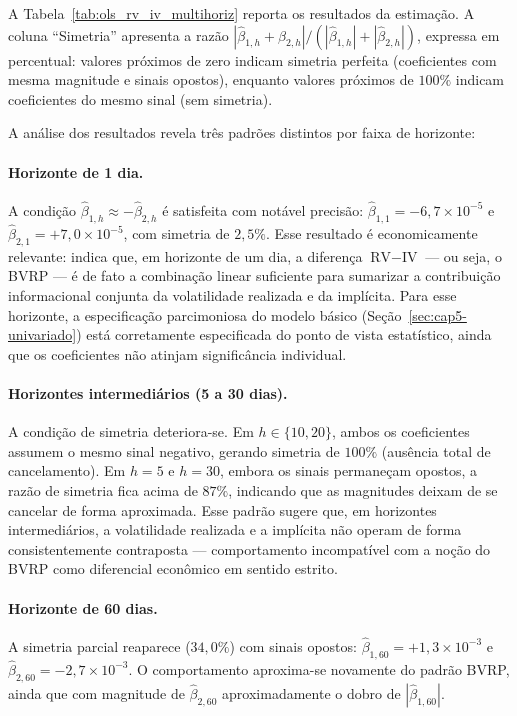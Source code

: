 A Tabela~\ref{tab:ols_rv_iv_multihoriz} reporta os resultados da estimação. A
coluna ``Simetria'' apresenta a razão
$|\hat{\beta}_{1,h} + \hat{\beta}_{2,h}| / (|\hat{\beta}_{1,h}| + |\hat{\beta}_{2,h}|)$,
expressa em percentual: valores próximos de zero indicam simetria perfeita
(coeficientes com mesma magnitude e sinais opostos), enquanto valores
próximos de $100\%$ indicam coeficientes do mesmo sinal (sem simetria).


A análise dos resultados revela três padrões distintos por faixa de horizonte:

\paragraph{Horizonte de 1 dia.} A condição
$\hat{\beta}_{1,h} \approx -\hat{\beta}_{2,h}$ é satisfeita com notável
precisão: $\hat{\beta}_{1,1} = -6{,}7 \times 10^{-5}$ e
$\hat{\beta}_{2,1} = +7{,}0 \times 10^{-5}$, com simetria de $2{,}5\%$. Esse
resultado é economicamente relevante: indica que, em horizonte de um dia, a
diferença $\text{RV} - \text{IV}$ --- ou seja, o BVRP --- é de fato a
combinação linear suficiente para sumarizar a contribuição informacional
conjunta da volatilidade realizada e da implícita. Para esse horizonte, a
especificação parcimoniosa do modelo básico (Seção~\ref{sec:cap5-univariado})
está corretamente especificada do ponto de vista estatístico, ainda que os
coeficientes não atinjam significância individual.

\paragraph{Horizontes intermediários (5 a 30 dias).} A condição de simetria
deteriora-se. Em $h \in \{10, 20\}$, ambos os coeficientes assumem o mesmo
sinal negativo, gerando simetria de $100\%$ (ausência total de cancelamento).
Em $h = 5$ e $h = 30$, embora os sinais permaneçam opostos, a razão de simetria
fica acima de $87\%$, indicando que as magnitudes deixam de se cancelar de forma
aproximada. Esse padrão sugere que, em horizontes intermediários, a volatilidade
realizada e a implícita não operam de forma consistentemente contraposta ---
comportamento incompatível com a noção do BVRP como diferencial econômico em
sentido estrito.

\paragraph{Horizonte de 60 dias.} A simetria parcial reaparece ($34{,}0\%$)
com sinais opostos: $\hat{\beta}_{1,60} = +1{,}3 \times 10^{-3}$ e
$\hat{\beta}_{2,60} = -2{,}7 \times 10^{-3}$. O comportamento aproxima-se
novamente do padrão BVRP, ainda que com magnitude de $\hat{\beta}_{2,60}$
aproximadamente o dobro de $|\hat{\beta}_{1,60}|$.

